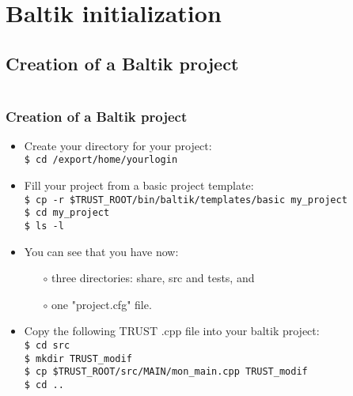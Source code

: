 \documentclass[10pt, hyperref={unicode=true,pdfusetitle, bookmarks=true,bookmarksnumbered=false,bookmarksopen=false, breaklinks=false,pdfborder={0 0 1},backref=true,colorlinks=true,linkcolor=darkblue,pageanchor, urlcolor=darkblue}]{beamer}
\begin{document}
\section{{\bf{Baltik initialization}}}
\subsection{{\bf{Creation of a Baltik project}}}
\begin{frame}
\begin{columns}[c] 
\tableofcontents[sections={1-3},currentsection, currentsubsection]
\tableofcontents[sections={4-8},currentsection, currentsubsection]
\end{columns}
\end{frame}
\begin{frame}
\frametitle{Creation of a Baltik project}
\begin{block}{}

\begin{itemize}
\item Create your directory for your project:\\
\texttt{\$ cd /export/home/yourlogin}

\item Fill your project from a basic project template:\\
\texttt{\$ cp -r \$TRUST\_ROOT/bin/baltik/templates/basic my\_project}\\
\texttt{\$ cd my\_project}\\
\texttt{\$ ls -l}

\item You can see that you have now:
    \begin{itemize}
    \item [$\circ$] three directories: share, src and tests, and
    \item [$\circ$] one "project.cfg" file.
    \end{itemize}

\item Copy the following TRUST .cpp file into your baltik project:\\
\texttt{\$ cd src}\\
\texttt{\$ mkdir TRUST\_modif} \\
\texttt{\$ cp \$TRUST\_ROOT/src/MAIN/mon\_main.cpp TRUST\_modif}\\
\texttt{\$ cd ..}
\end{itemize}

\end{block}
\end{frame}
\end{document}
